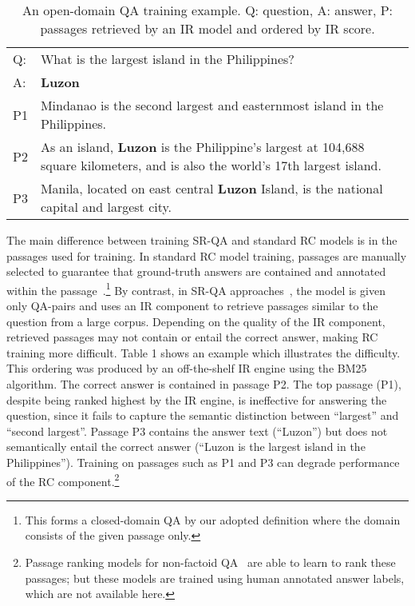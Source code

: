 \documentclass[letterpaper]{article} \usepackage{aaai18}  \usepackage{times}  \usepackage{helvet}  \usepackage{courier}  \usepackage{url}  \usepackage{graphicx}  \usepackage{comment}
\begin{document}
\begin{table}[]
\centering
\small
\begin{tabular}{ll}
Q: & \multicolumn{1}{p{7cm}}{What is the largest island in the Philippines?}                                                      \\
A: & \multicolumn{1}{p{7cm}}{\textbf{Luzon}}\\
P1 & \multicolumn{1}{p{7cm}}{Mindanao is the second largest and easternmost island in the Philippines.}                               \\
P2 & \multicolumn{1}{p{7cm}}{As an island, \textbf{Luzon} is the Philippine's largest at 104,688 square kilometers, and is also the world's 17th largest island.}                                       \\
P3 & \multicolumn{1}{p{7cm}}{Manila, located on east central \textbf{Luzon} Island, is the national capital and largest city. }                                       \\
\end{tabular}
\normalsize
\caption{An open-domain QA training example. Q: question, A: answer, P: passages retrieved by an IR model and ordered by IR score. }
\label{example}
\end{table}
The main difference between training SR-QA and standard RC models is in the passages used for training. In standard RC model training, passages are manually selected to guarantee that ground-truth answers are contained and annotated within the passage~\cite{rajpurkar2016squad}.\footnote{This forms a closed-domain QA by our adopted definition where the domain consists of the given passage only.}
By contrast, in SR-QA approaches~\cite{chen2017reading,dhingra2017quasar}, the model is given only QA-pairs and uses an IR component to retrieve passages similar to the question from a large corpus. 
Depending on the quality of the IR component, retrieved passages may not contain or entail the correct answer, making RC training more difficult.
Table 1 shows an example which illustrates the difficulty. This ordering was produced by an off-the-shelf IR engine using the BM25 algorithm. The correct answer is contained in passage P2. The top passage (P1), despite being ranked highest by the IR engine, is ineffective for answering the question, since it fails to capture the semantic distinction between ``largest'' and ``second largest''. Passage P3 contains the answer text (``Luzon'') but does not semantically entail the correct answer (``Luzon is the largest island in the Philippines''). Training on passages such as P1 and P3 can degrade performance of the RC component.\footnote{Passage ranking models for non-factoid QA~\cite{wang2007jeopardy,yang2015wikiqa} are able to learn to rank these passages; but these models are trained using human annotated answer labels, which are not available here.}  
\end{document}
